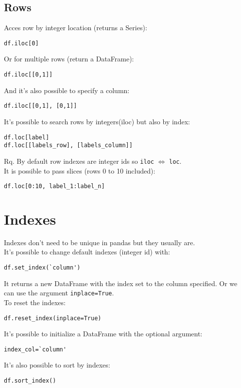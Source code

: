 \documentclass[french]{article}
\begin{document}
\subsection{Rows}
Acces row by integer location (returns a Series):
\begin{verbatim}
df.iloc[0]
\end{verbatim}
Or for multiple rows (return a DataFrame):
\begin{verbatim}
df.iloc[[0,1]]
\end{verbatim}
And it's also possible to specify a column:
\begin{verbatim}
df.iloc[[0,1], [0,1]]
\end{verbatim}
It's possible to search rows by integers(iloc) but also by index:
\begin{verbatim}
df.loc[label]
df.loc[[labels_row], [labels_column]]
\end{verbatim}
Rq. By default row indexes are integer ids so \verb|iloc| $\Leftrightarrow$ \verb|loc|. \\

It is possible to pass slices (rows 0 to 10 included):
\begin{verbatim}
df.loc[0:10, label_1:label_n]
\end{verbatim}

\section{Indexes}

Indexes don't need to be unique in pandas but they usually are.\\
It's possible to change default indexes (integer id) with:
\begin{verbatim}
df.set_index(`column')
\end{verbatim}
It returns a new DataFrame with the index set to the column specified. Or we can use the argument \verb|inplace=True|.\\

To reset the indexes:
\begin{verbatim}
df.reset_index(inplace=True)
\end{verbatim}
It's possible to initialize a DataFrame with the optional argument:
\begin{verbatim}
index_col=`column'
\end{verbatim}
It's also possible to sort by indexes:
\begin{verbatim}
df.sort_index()
\end{verbatim}
\end{document}
